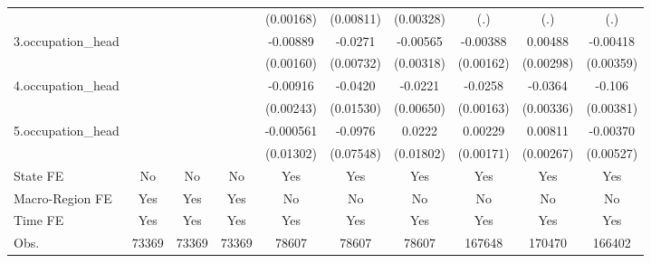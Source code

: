 \begin{table}[htbp]
\begin{tabular}{l*{9}{c}}
            &                     &                     &                     &   (0.00168)         &   (0.00811)         &   (0.00328)         &         (.)         &         (.)         &         (.)         \\
3.occupation\_head&                     &                     &                     &    -0.00889\sym{***}&     -0.0271\sym{***}&    -0.00565\sym{*}  &    -0.00388\sym{**} &     0.00488         &    -0.00418         \\
            &                     &                     &                     &   (0.00160)         &   (0.00732)         &   (0.00318)         &   (0.00162)         &   (0.00298)         &   (0.00359)         \\
4.occupation\_head&                     &                     &                     &    -0.00916\sym{***}&     -0.0420\sym{***}&     -0.0221\sym{***}&     -0.0258\sym{***}&     -0.0364\sym{***}&      -0.106\sym{***}\\
            &                     &                     &                     &   (0.00243)         &   (0.01530)         &   (0.00650)         &   (0.00163)         &   (0.00336)         &   (0.00381)         \\
5.occupation\_head&                     &                     &                     &   -0.000561         &     -0.0976         &      0.0222         &     0.00229         &     0.00811\sym{***}&    -0.00370         \\
            &                     &                     &                     &   (0.01302)         &   (0.07548)         &   (0.01802)         &   (0.00171)         &   (0.00267)         &   (0.00527)         \\
State FE    &          No         &          No         &          No         &         Yes         &         Yes         &         Yes         &         Yes         &         Yes         &         Yes         \\
Macro-Region FE &         Yes         &         Yes         &         Yes         &          No         &          No         &          No         &          No         &          No         &          No         \\
Time FE     &         Yes         &         Yes         &         Yes         &         Yes         &         Yes         &         Yes         &         Yes         &         Yes         &         Yes         \\
\hline
Obs.        &       73369         &       73369         &       73369         &       78607         &       78607         &       78607         &      167648         &      170470         &      166402         \\

\end{tabular}
\end{table}
